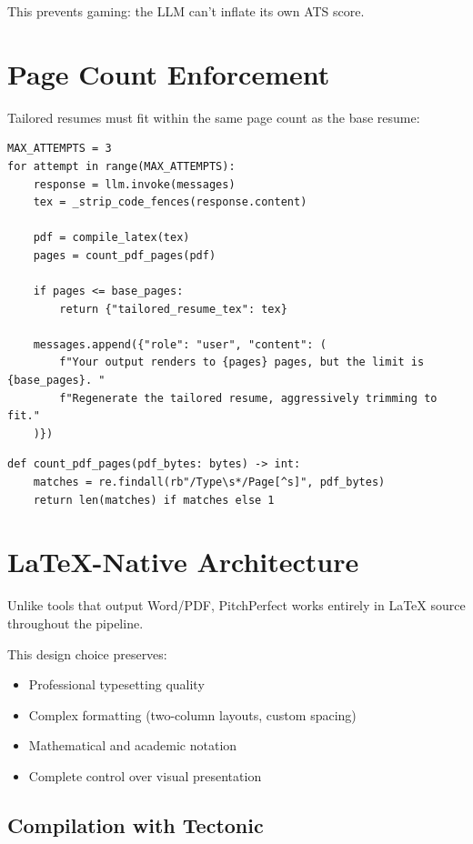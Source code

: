 \documentclass[12pt, a4paper]{article}
\begin{document}
This prevents gaming: the LLM can't inflate its own ATS score.

\newpage

\section{Page Count Enforcement}

Tailored resumes must fit within the same page count as the base resume:

\begin{verbatim}
MAX_ATTEMPTS = 3
for attempt in range(MAX_ATTEMPTS):
    response = llm.invoke(messages)
    tex = _strip_code_fences(response.content)

    pdf = compile_latex(tex)
    pages = count_pdf_pages(pdf)

    if pages <= base_pages:
        return {"tailored_resume_tex": tex}

    messages.append({"role": "user", "content": (
        f"Your output renders to {pages} pages, but the limit is {base_pages}. "
        f"Regenerate the tailored resume, aggressively trimming to fit."
    )})
\end{verbatim}

\begin{verbatim}
def count_pdf_pages(pdf_bytes: bytes) -> int:
    matches = re.findall(rb"/Type\s*/Page[^s]", pdf_bytes)
    return len(matches) if matches else 1
\end{verbatim}

\newpage

\section{LaTeX-Native Architecture}

Unlike tools that output Word/PDF, PitchPerfect works entirely in LaTeX source throughout the pipeline.

\bigskip

This design choice preserves:
\begin{itemize}
    \item Professional typesetting quality
    \item Complex formatting (two-column layouts, custom spacing)
    \item Mathematical and academic notation
    \item Complete control over visual presentation
\end{itemize}

\subsection{Compilation with Tectonic}
\end{document}
